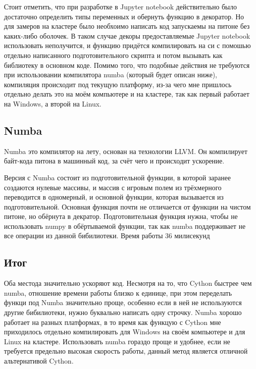 \documentclass[a4paper,12pt]{article}
\begin{document}
Стоит отметить, что при разработке в Jupyter notebook действительно было достаточно определить типы переменных и обернуть функцию в декоратор. Но для замеров на кластере было необхоимо написать код запускаемы на питоне без каких-либо оболочек. В таком случае декоры предоставляемые Jupyter notebook использовать неполучится, и функцию придётся компилировать на си с помошью отдельно написанного подготовительного скрипта и потом вызывать как библиотеку в основном коде. Помимо того, что подобные действия не требуются при использовании компилятора numba (который будет описан ниже), компиляция происходит под текущую платформу, из-за чего мне пришлось отдельно делать это на моём компьютере и на кластере, так как первый работает на Windows, а второй на Linux.



\subsection{Numba}

Numba это компилятор на лету, основан на технологии LLVM. Он компилирует байт-кода питона в машинный код, за счёт чего и происходит ускорение.

Версия с Numba состоит из подготовительной функции, в которой заранее создаются нулевые массивы, и массив с игровым полем из трёхмерного переводится в одномерный, и основной функции, которая вызывается из подготовительной. Основная функция почти не отличается от функции на чистом питоне, но обёрнута в декратор. Подготовительная функция нужна, чтобы не использовать numpy в обёртываемой функции, так как numba поддерживает не все операции из данной бибилиотеки. Время работы 36 милисекунд



\subsection{Итог}





Оба местода значительно ускоряют код. Несмотря на то, что Cython быстрее чем numba, отношение времени работы близко к единице, при этом переделать функци под Numba значительно проще, особенно если в ней не используются другие бибилиотеки, нужно буквально написать одну строчку. Numba хорошо работает на разных платформах, в то время как функцую с Cython мне приходилось отдельно компилировать для Windows на своём компьютере и  для Linux на кластере. Использовать numba гораздо проще и удобнее, если не требуется предельно высокая скорость работы, данный метод является отличной альтернативой Cython. 
\end{document}
